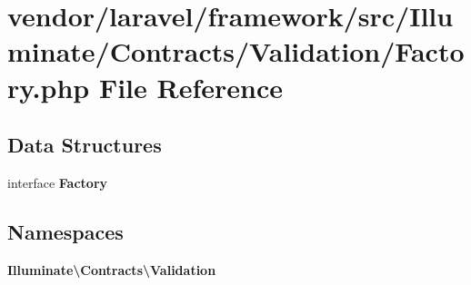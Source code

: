 \section{vendor/laravel/framework/src/\+Illuminate/\+Contracts/\+Validation/\+Factory.php File Reference}
\label{laravel_2framework_2src_2_illuminate_2_contracts_2_validation_2_factory_8php}
\subsection*{Data Structures}
\begin{DoxyCompactItemize}
\item 
interface {\bf Factory}
\end{DoxyCompactItemize}
\subsection*{Namespaces}
\begin{DoxyCompactItemize}
\item 
 {\bf Illuminate\textbackslash{}\+Contracts\textbackslash{}\+Validation}
\end{DoxyCompactItemize}
